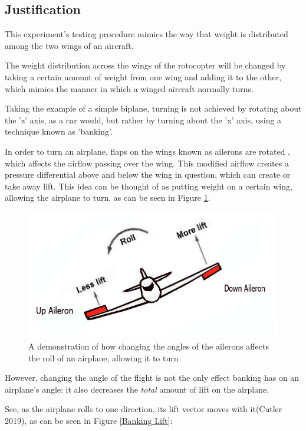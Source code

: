 \documentclass[]{article}
\theoremstyle{definition}
\begin{document}
\subsection{Justification}\label{Hypothesis Justification}
This experiment's testing procedure mimics the way that weight is distributed among the two wings of an aircraft.

The weight distribution across the wings of the rotocopter will be changed by taking a certain amount of weight from one wing and adding it to the other, which mimics the manner in which a winged aircraft normally turns.

Taking the example of a simple biplane, turning is not achieved by rotating about the 'z' axis, as a car would, but rather by turning about the 'x' axis, using a technique known as 'banking'.

In order to turn an airplane, flaps on the wings known as ailerons are rotated , which affects the airflow passing over the wing. This modified airflow creates a pressure differential above and below the wing in question, which can create or take away lift. This idea can be thought of as putting weight on a certain wing, allowing the airplane to turn, as can be seen in Figure \ref{Banked Turn}.

\begin{figure}[H]
    \centering
    \includegraphics[scale=0.5]{graphics/aileron.jpg}
    \caption{A demonstration of how changing the angles of the ailerons affects the roll of an airplane, allowing it to turn}
    \label{Banked Turn}
\end{figure}

However, changing the angle of the flight is not the only effect banking has on an airplane's angle: it also decreases the \textit{total} amount of lift on the airplane.

See, as the airplane rolls to one direction, its lift vector moves with it(Cutler 2019), as can be seen in Figure \ref{Banking Lift}:
\end{document}
